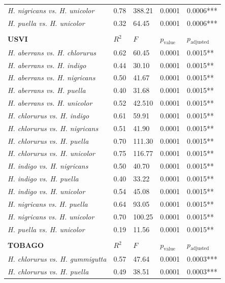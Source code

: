 \begin{xltabular}{\textwidth}{p{5cm}*{4}{X}}
    \emph{H. nigricans vs. H. unicolor} & 0.78 & 388.21 & 0.0001 & 0.0006*** \\
    \emph{H. puella vs. H. unicolor} & 0.32 & 64.45 & 0.0001 & 0.0006*** \\ \\
    \hline \hline
    \textbf{USVI} & $R^2$ & $F$ & $p_{\text{value}}$ & $p_{\text{adjusted}}$\\
    \hline
    \hline
    \emph{H. aberrans vs. H. chlorurus} & 0.62 & 60.45 & 0.0001 & 0.0015** \\
    \emph{H. aberrans vs. H. indigo} & 0.44 & 30.10 & 0.0001 & 0.0015** \\
    \emph{H. aberrans vs. H. nigricans} & 0.50 & 41.67 & 0.0001 & 0.0015** \\  
    \emph{H. aberrans vs. H. puella} & 0.40 & 31.68 & 0.0001 & 0.0015** \\
    \emph{H. aberrans vs. H. unicolor} & 0.52 & 42.510 & 0.0001 & 0.0015** \\
    \emph{H. chlorurus vs. H. indigo} & 0.61 & 59.91 & 0.0001 & 0.0015** \\
    \emph{H. chlorurus vs. H. nigricans} & 0.51 & 41.90 & 0.0001 & 0.0015** \\ 
    \emph{H. chlorurus vs. H. puella} & 0.70 & 111.30 & 0.0001 & 0.0015** \\
    \emph{H. chlorurus vs. H. unicolor} & 0.75 & 116.77 & 0.0001 & 0.0015** \\
    \emph{H. indigo vs. H. nigricans} & 0.50 & 40.70 & 0.0001 & 0.0015** \\  
    \emph{H. indigo vs. H. puella} & 0.40 & 33.22 & 0.0001 & 0.0015** \\
    \emph{H. indigo vs. H. unicolor} & 0.54 & 45.08 & 0.0001 & 0.0015** \\
    \emph{H. nigricans vs. H. puella} & 0.64 & 93.05 & 0.0001 & 0.0015** \\ 
    \emph{H. nigricans vs. H. unicolor} & 0.70 & 100.25 & 0.0001 & 0.0015** \\ 
    \emph{H. puella vs. H. unicolor} & 0.19 & 11.56 & 0.0001 & 0.0015** \\ \\
    \hline \hline
    \textbf{TOBAGO} & $R^2$ & $F$ & $p_{\text{value}}$ & $p_{\text{adjusted}}$\\
    \hline
    \hline
    \emph{H. chlorurus vs. H. gummigutta} & 0.57 & 47.64 & 0.0001 & 0.0003*** \\
    \emph{H. chlorurus vs. H. puella} & 0.49 & 38.51 & 0.0001 & 0.0003*** \\

\end{xltabular}
